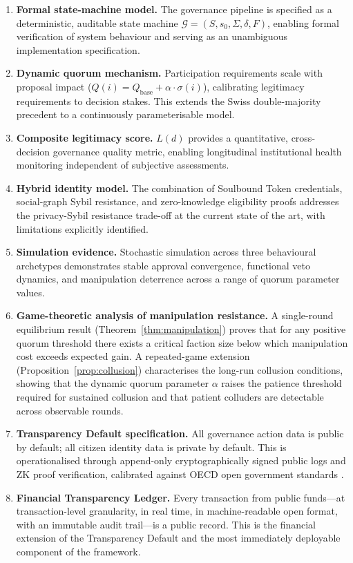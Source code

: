 \documentclass[12pt,a4paper,oneside]{report}
\begin{document}
\begin{enumerate}
  \item \textbf{Formal state-machine model.} The governance pipeline is specified as a deterministic, auditable state machine $\mathcal{G} = (S, s_0, \Sigma, \delta, F)$, enabling formal verification of system behaviour and serving as an unambiguous implementation specification.
  \item \textbf{Dynamic quorum mechanism.} Participation requirements scale with proposal impact ($Q(i) = Q_{\text{base}} + \alpha\cdot\sigma(i)$), calibrating legitimacy requirements to decision stakes. This extends the Swiss double-majority precedent to a continuously parameterisable model.
  \item \textbf{Composite legitimacy score.} $L(d)$ provides a quantitative, cross-decision governance quality metric, enabling longitudinal institutional health monitoring independent of subjective assessments.
  \item \textbf{Hybrid identity model.} The combination of Soulbound Token credentials, social-graph Sybil resistance, and zero-knowledge eligibility proofs addresses the privacy-Sybil resistance trade-off at the current state of the art, with limitations explicitly identified.
  \item \textbf{Simulation evidence.} Stochastic simulation across three behavioural archetypes demonstrates stable approval convergence, functional veto dynamics, and manipulation deterrence across a range of quorum parameter values.
  \item \textbf{Game-theoretic analysis of manipulation resistance.} A single-round equilibrium result (Theorem~\ref{thm:manipulation}) proves that for any positive quorum threshold there exists a critical faction size below which manipulation cost exceeds expected gain. A repeated-game extension (Proposition~\ref{prop:collusion}) characterises the long-run collusion conditions, showing that the dynamic quorum parameter $\alpha$ raises the patience threshold required for sustained collusion and that patient colluders are detectable across observable rounds.
  \item \textbf{Transparency Default specification.} All governance action data is public by default; all citizen identity data is private by default. This is operationalised through append-only cryptographically signed public logs and ZK proof verification, calibrated against OECD open government standards \citep{oecd2020open}.
  \item \textbf{Financial Transparency Ledger.} Every transaction from public funds---at transaction-level granularity, in real time, in machine-readable open format, with an immutable audit trail---is a public record. This is the financial extension of the Transparency Default and the most immediately deployable component of the framework.

\end{enumerate}
\end{document}
